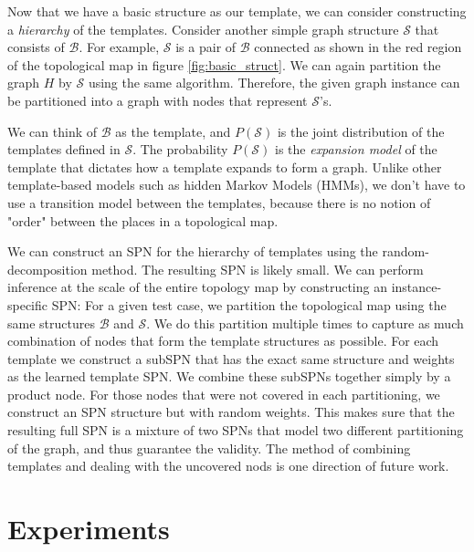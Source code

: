 \documentclass[11pt, titlepage]{article}
\theoremstyle{definition}
\begin{document}
Now that we have a basic structure as our template, we can consider constructing a \textit{hierarchy} of the templates. Consider another simple graph structure $\mathcal{S}$ that consists of $\mathcal{B}$. For example, $\mathcal{S}$ is a pair of $\mathcal{B}$ connected as shown in the red region of the topological map in figure \ref{fig:basic_struct}. We can again partition the graph $H$ by $\mathcal{S}$ using the same algorithm. Therefore, the given graph instance can be partitioned into a graph with nodes that represent $\mathcal{S}$'s.

We can think of $\mathcal{B}$ as the template, and $P(\mathcal{S})$ is the joint distribution of the templates defined in $\mathcal{S}$. The probability $P(\mathcal{S})$ is the \textit{expansion model} of the template that dictates how a template expands to form a graph. Unlike other template-based models such as hidden Markov Models (HMMs), we don't have to use a transition model between the templates, because there is no notion of "order" between the places in a topological map.

We can construct an SPN for the hierarchy of templates using the random-decomposition method. The resulting SPN is likely small. We can perform inference at the scale of the entire topology map by constructing an instance-specific SPN: For a given test case, we partition the topological map using the same structures $\mathcal{B}$ and $\mathcal{S}$. We do this partition multiple times to capture as much combination of nodes that form the template structures as possible. For each template we construct a subSPN that has the exact same structure and weights as the learned template SPN. We combine these subSPNs together simply by a product node. For those nodes that were not covered in each partitioning, we construct an SPN structure but with random weights. This makes sure that the resulting full SPN is a mixture of two SPNs that model two different partitioning of the graph, and thus guarantee the validity. The method of combining templates and dealing with the uncovered nods is one direction of future work.

\section{Experiments}\label{section:experiment}
\end{document}
